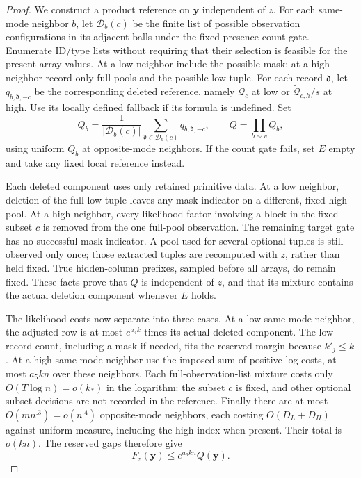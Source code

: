 \begin{proof}
We construct a product reference on \(\mathbf y\) independent of
\(z\). For each same-mode neighbor \(b\), let \(\mathcal D_b(c)\) be
the finite list of possible observation configurations in its adjacent
balls under the fixed presence-count gate. Enumerate ID/type lists
without requiring that their selection is feasible for the present
array values. At a low neighbor include the possible mask; at a high
neighbor record only full pools and the possible low tuple. For each
record \(\mathfrak d\), let \(q_{b,\mathfrak d,-c}\) be the
corresponding deleted reference, namely \(\mathcal Q_c\) at low or
\(\widetilde{\mathcal Q}_{c,h}/s\) at high. Use its locally defined
fallback if its formula is undefined. Set
\[
 Q_b=\frac1{|\mathcal D_b(c)|}
          \sum_{\mathfrak d\in\mathcal D_b(c)}q_{b,\mathfrak d,-c},
 \qquad Q=\prod_{b\sim v}Q_b,
\]
using uniform \(Q_b\) at opposite-mode neighbors. If the count gate
fails, set \(E\) empty and take any fixed local reference instead.

Each deleted component uses only retained primitive data. At a low
neighbor, deletion of the full low tuple leaves any mask indicator on
a different, fixed high pool. At a high neighbor, every likelihood
factor involving a block in the fixed subset \(c\) is removed from
the one full-pool observation. The remaining target gate has no
successful-mask indicator. A pool used for several optional tuples is
still observed only once; those extracted tuples are recomputed with
\(z\), rather than held fixed. True hidden-column prefixes, sampled
before all arrays, do remain fixed. These facts prove that \(Q\) is
independent of \(z\), and that its mixture contains the actual deletion
component whenever \(E\) holds.

The likelihood costs now separate into three cases. At a low same-mode
neighbor, the adjusted row is at most \(e^{a_4k}\) times its actual
deleted component. The low record count, including a mask if needed,
fits the reserved margin because \(k'_j\le k\). At a high same-mode
neighbor use the imposed sum of positive-log costs, at most
\(a_5kn\) over these neighbors. Each full-observation-list mixture
costs only \(O(T\log n)=o(k_*)\) in the logarithm: the subset \(c\)
is fixed, and other optional subset decisions are not recorded in the
reference. Finally there are at most
\(O(mn^{.3})=o(n^{.4})\) opposite-mode neighbors, each costing
\(O(D_L+D_H)\) against uniform measure, including the high index when
present. Their total is \(o(kn)\). The reserved gaps therefore give
\[
 F_z(\mathbf y)\le e^{a_6kn}Q(\mathbf y).
\]


\end{proof}
